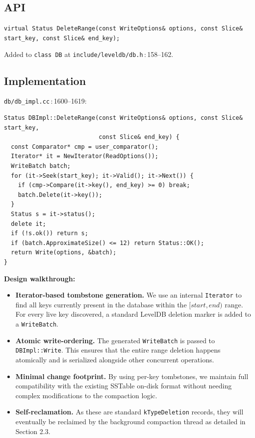 \documentclass[11pt,a4paper]{article}
\newcommand{\codref}[2]{\textcolor{accent}{\texttt{\small#1}}\,$\!:\!$\textcolor{primary!70!black}{\small#2}}
\newcommand{\fname}[1]{\textcolor{primary!85!black}{\texttt{#1}}}
\newcommand{\sym}[1]{\texttt{#1}}
\begin{document}
\subsection{API}

\begin{spec}[Signature]
\sym{virtual Status DeleteRange(const WriteOptions\& options,
                              const Slice\& start\_key,
                              const Slice\& end\_key);}
\end{spec}

Added to \sym{class DB} at \codref{include/leveldb/db.h}{158--162}.

\subsection{Implementation}

\codref{db/db\_impl.cc}{1600--1619}:

\begin{lstlisting}
Status DBImpl::DeleteRange(const WriteOptions& options, const Slice& start_key,
                           const Slice& end_key) {
  const Comparator* cmp = user_comparator();
  Iterator* it = NewIterator(ReadOptions());
  WriteBatch batch;
  for (it->Seek(start_key); it->Valid(); it->Next()) {
    if (cmp->Compare(it->key(), end_key) >= 0) break;
    batch.Delete(it->key());
  }
  Status s = it->status();
  delete it;
  if (!s.ok()) return s;
  if (batch.ApproximateSize() <= 12) return Status::OK();
  return Write(options, &batch);
}
\end{lstlisting}

\textbf{Design walkthrough:}

\begin{itemize}[leftmargin=1.4em,itemsep=4pt]
    \item \textbf{Iterator-based tombstone generation.} We use an internal \fname{Iterator} to find all keys currently present in the database within the $[start, end)$ range. For every live key discovered, a standard LevelDB deletion marker is added to a \fname{WriteBatch}.
    \item \textbf{Atomic write-ordering.} The generated \fname{WriteBatch} is passed to \fname{DBImpl::Write}. This ensures that the entire range deletion happens atomically and is serialized alongside other concurrent operations.
    \item \textbf{Minimal change footprint.} By using per-key tombstones, we maintain full compatibility with the existing SSTable on-disk format without needing complex modifications to the compaction logic.
    \item \textbf{Self-reclamation.} As these are standard \fname{kTypeDeletion} records, they will eventually be reclaimed by the background compaction thread as detailed in Section 2.3.
\end{itemize}
\end{document}

